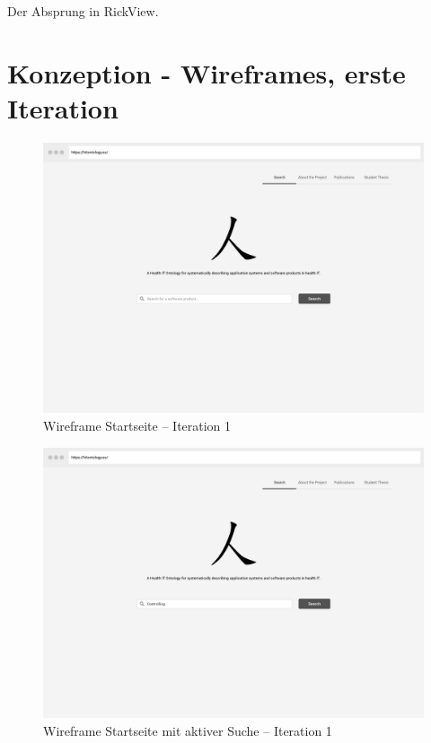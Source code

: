 \noindent  Der Absprung in RickView.\\

\chapter{Konzeption - Wireframes, erste Iteration}\label{app_wireframes}

\begin{figure}[ht]
	\centering
    	\includegraphics[width=1.4\textwidth, angle=90]{Images/Desktop_1}
   	\caption[Wireframe -- Startseite]{Wireframe Startseite -- Iteration 1}
\end{figure}

\clearpage

\begin{figure}[ht]
	\centering
    	\includegraphics[width=1.4\textwidth, angle=-90]{Images/Desktop_2}
   	\caption[Wireframe -- Startseite mit aktiver Suche]{Wireframe Startseite mit aktiver Suche -- Iteration 1}
\end{figure}

